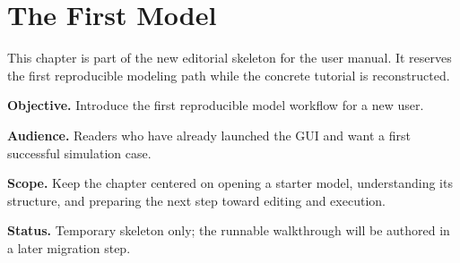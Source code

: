 \chapter{The First Model}
\label{chap:first-model}

This chapter is part of the new editorial skeleton for the user manual. It reserves the first reproducible modeling path while the concrete tutorial is reconstructed.

\noindent\textbf{Objective.} Introduce the first reproducible model workflow for a new user.

\noindent\textbf{Audience.} Readers who have already launched the GUI and want a first successful simulation case.

\noindent\textbf{Scope.} Keep the chapter centered on opening a starter model, understanding its structure, and preparing the next step toward editing and execution.

\noindent\textbf{Status.} Temporary skeleton only; the runnable walkthrough will be authored in a later migration step.
